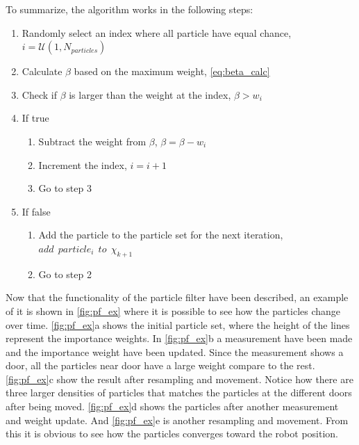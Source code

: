 \documentclass[Main]{subfiles}
\begin{document}
To summarize, the algorithm works in the following steps:
\begin{enumerate}
\item Randomly select an index where all particle have equal chance, $i = \mathcal{U}(1,N_{particles})$ 
\item Calculate $\beta$ based on the maximum weight, \autoref{eq:beta_calc}
\item Check if $\beta$ is larger than the weight at the index, $\beta > w_i$
\item If true
\begin{enumerate}
	\item Subtract the weight from $\beta$, $\beta = \beta-w_i$
	\item Increment the index, $i = i+1$
	\item Go to step 3	
\end{enumerate}
\item If false
\begin{enumerate}
	\item Add the particle to the particle set for the next iteration, $add \:\: particle_i \:\: to \:\: \chi_{k+1}$
	\item Go to step 2
\end{enumerate}
\end{enumerate}
Now that the functionality of the particle filter have been described, an example of it is shown in \autoref{fig:pf_ex} where it is possible to see how the particles change over time.
\autoref{fig:pf_ex}a shows the initial particle set, where the height of the lines represent the importance weights. 
In \autoref{fig:pf_ex}b a measurement have been made and the importance weight have been updated.
Since the measurement shows a door, all the particles near door have a large weight compare to the rest.
\autoref{fig:pf_ex}c show the result after resampling and movement.
Notice how there are three larger densities of particles that matches the particles at the different doors after being moved.
\autoref{fig:pf_ex}d shows the particles after another measurement and weight update. And \autoref{fig:pf_ex}e is another resampling and movement.
From this it is obvious to see how the particles converges toward the robot position.
\end{document}
